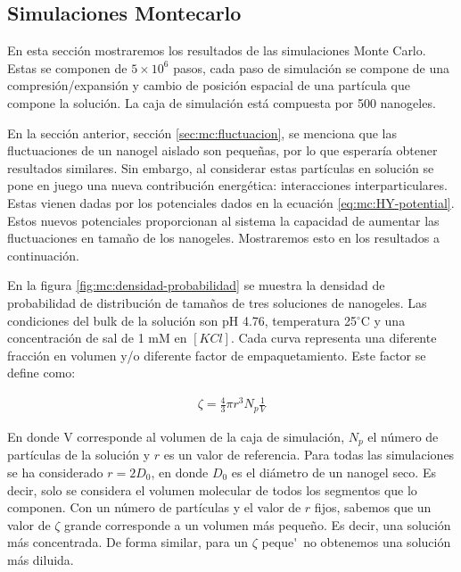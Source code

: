 	
	\subsection{Simulaciones Montecarlo}
	
	En esta secci\'on mostraremos los resultados de las simulaciones Monte Carlo. Estas se componen de  $5\times 10^6$ pasos, cada paso de simulaci\'on se compone de una compresi\'on/expansi\'on y cambio de posici\'on espacial de una part\'icula que compone la soluci\'on. La caja de simulaci\'on est\'a compuesta por 500 nanogeles.
	
	En la secci\'on anterior, secci\'on \ref{sec:mc:fluctuacion}, se menciona que las fluctuaciones de un nanogel aislado son peque\~nas, por lo que esperar\'ia obtener resultados similares. Sin embargo, al considerar estas part\'iculas en soluci\'on se pone en juego una nueva contribuci\'on energ\'etica: interacciones interparticulares. Estas vienen dadas por los potenciales dados en la ecuaci\'on \ref{eq:mc:HY-potential}.
	Estos nuevos potenciales proporcionan al sistema la capacidad de aumentar las fluctuaciones en tama\~no de los nanogeles. Mostraremos esto en los resultados a continuaci\'on.
	
	En la figura \ref{fig:mc:densidad-probabilidad} se muestra la densidad de probabilidad de distribuci\'on de tama\~nos de tres soluciones de nanogeles. Las condiciones del bulk de la soluci\'on son pH 4.76, temperatura 25$^\circ$C y una concentraci\'on de sal de 1 mM en $[KCl]$.
	Cada curva representa una diferente fracci\'on en volumen y/o diferente factor de empaquetamiento. Este factor se define como:
	
	
	
	\begin{align}
		\zeta = \frac{4}{3} \pi r^3 N_p \frac{1}{V}
	\end{align}
	
	En donde V corresponde al volumen de la caja de simulación, $N_p$ el n\'umero de part\'iculas de la soluci\'on y $r$ es un valor de referencia.
	Para todas las simulaciones se ha considerado $r= 2D_0$, en donde $D_0$ es el di\'ametro de un nanogel seco. Es decir, solo se considera el volumen molecular de todos los segmentos que lo componen.
	Con un n\'umero de part\'iculas y el valor de $r$ fijos, sabemos que un valor de $\zeta$ grande corresponde a un volumen m\'as peque\~no. Es decir, una soluci\'on m\'as concentrada.
	De forma similar, para un $\zeta$ peque\'~no obtenemos una soluci\'on m\'as diluida.
	
